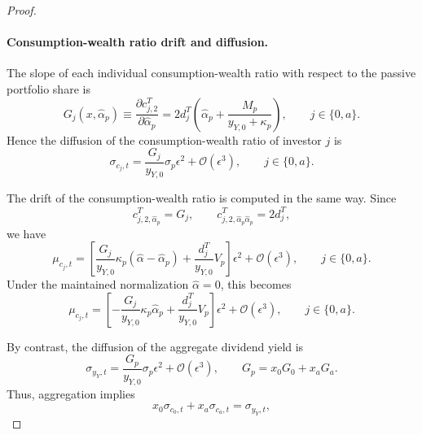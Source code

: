 \begin{proof}
\paragraph{Consumption-wealth ratio drift and diffusion.}
The slope of each individual consumption-wealth ratio with respect to the passive portfolio share is
\begin{equation}\label{eq:Gcj-noheterog}
    G_j(x,\hat{\alpha}_p)
    \equiv \frac{\partial c_{j,2}^{T}}{\partial\hat{\alpha}_p}
    =2d_j^T\left(\hat{\alpha}_p+\frac{M_p}{y_{Y,0}+\kappa_p}\right),
    \qquad j\in\{0,a\}.
\end{equation}
Hence the diffusion of the consumption-wealth ratio of investor $j$ is
\begin{equation}\label{eq:sigmacj-noheterog}
    \sigma_{c_j,t}
    =\frac{G_j}{y_{Y,0}}\sigma_p\epsilon^2+\mathcal{O}(\epsilon^3),
    \qquad j\in\{0,a\}.
\end{equation}

The drift of the consumption-wealth ratio is computed in the same way.
Since
\begin{equation}
    c_{j,2,\hat{\alpha}_p}^{T}=G_j,
    \qquad
    c_{j,2,\hat{\alpha}_p\hat{\alpha}_p}^{T}=2d_j^T,
\end{equation}
we have
\begin{equation}\label{eq:mucj-noheterog}
    \mu_{c_j,t}
    =\left[
        \frac{G_j}{y_{Y,0}}\kappa_p(\hat{\alpha}-\hat{\alpha}_p)
        +\frac{d_j^T}{y_{Y,0}}V_p
    \right]\epsilon^2
    +\mathcal{O}(\epsilon^3),
    \qquad j\in\{0,a\}.
\end{equation}
Under the maintained normalization $\hat{\alpha}=0$, this becomes
\begin{equation}\label{eq:mucj-noheterog-alpha-zero}
    \mu_{c_j,t}
    =\left[
        -\frac{G_j}{y_{Y,0}}\kappa_p\hat{\alpha}_p
        +\frac{d_j^T}{y_{Y,0}}V_p
    \right]\epsilon^2
    +\mathcal{O}(\epsilon^3),
    \qquad j\in\{0,a\}.
\end{equation}

By contrast, the diffusion of the aggregate dividend yield is
\begin{equation}\label{eq:sigmay-noheterog-from-Gp}
    \sigma_{y_Y,t}
    =\frac{G_p}{y_{Y,0}}\sigma_p\epsilon^2+\mathcal{O}(\epsilon^3),
    \qquad
    G_p=x_0G_0+x_aG_a.
\end{equation}
Thus, aggregation implies
\begin{equation}
    x_0\sigma_{c_0,t}+x_a\sigma_{c_a,t}=\sigma_{y_Y,t},
\end{equation}



\end{proof}
